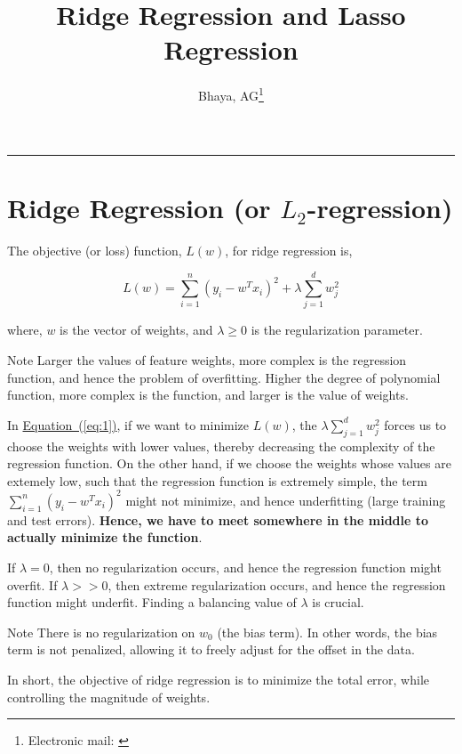 \documentclass{scrartcl}
\title{Ridge Regression and Lasso Regression}
\author{Bhaya, AG\thanks{\faEnvelope[regular] Electronic mail: \href{mailto:angubh.io@gmail.com}{\code{ananya[dot]gb[at]nbu[dot]ac[dot]in}}}}
\newcounter{prob}
\renewcommand{\eqref}[1]{\hyperref[#1]{Equation~(\ref*{#1})}}
\begin{document}
	\maketitle
	\hrule
	\vspace{1em}

	\section{Ridge Regression (or \(L_2\)-regression)}
	The objective (or loss) function, \(L(w)\), for ridge regression is,
	
	\begin{equation}\label{eq:1}
		L(w)=\sum_{i=1}^{n}(y_i-w^Tx_i)^2+\lambda\sum_{j=1}^{d}w_j^2
	\end{equation}
	
	where, \(w\) is the vector of weights, and \(\lambda\ge0\) is the regularization parameter.
	
	\begin{note}{Note}
		Larger the values of feature weights, more complex is the regression function, and hence the problem of overfitting. Higher the degree of polynomial function, more complex is the function, and larger is the value of weights.
	\end{note}
	
	In \eqref{eq:1}, if we want to minimize \(L(w)\), the \(\displaystyle{\lambda\sum_{j=1}^{d}w_j^2}\) forces us to choose the weights with lower values, thereby decreasing the complexity of the regression function. On the other hand, if we choose the weights whose values are extemely low, such that the regression function is extremely simple, the term \(\displaystyle{\sum_{i=1}^{n}(y_i-w^Tx_i)^2}\) might not minimize, and hence underfitting (large training and test errors). \textbf{Hence, we have to meet somewhere in the middle to actually minimize the function}.
	
	If \(\lambda=0\), then no regularization occurs, and hence the regression function might overfit. If \(\lambda>>0\), then extreme regularization occurs, and hence the regression function might underfit. Finding a balancing value of \(\lambda\) is crucial.
	
	\begin{note}{Note}
		There is no regularization on \(w_0\) (the bias term). In other words, the bias term is not penalized, allowing it to freely adjust for the offset in the data.
	\end{note}
	
	In short, the objective of ridge regression is to minimize the total error, while controlling the magnitude of weights.
	
\end{document}
